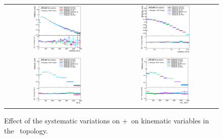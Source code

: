 \begin{figure}[p]
\begin{center}
\begin{tabular}{cc}
\includegraphics[width=0.48\textwidth]{Modeling/Figures/mgcc_tt2cq_q1_pt_norm.eps} &
\includegraphics[width=0.48\textwidth]{Modeling/Figures/mgcc_tt2cq_q1_eta_norm.eps} \\
\includegraphics[width=0.48\textwidth]{Modeling/Figures/mgcc_tt2cq_top_pt_norm.eps} &
\includegraphics[width=0.48\textwidth]{Modeling/Figures/mgcc_tt2cq_ttbar_pt_norm.eps} \\
\end{tabular}
\caption{Effect of the systematic variations on \madgraph+\pythia\ on kinematic variables in the \ttcc\ topology.}
\label{fig:mgcc_tt2c}
\end{center}
\end{figure}
